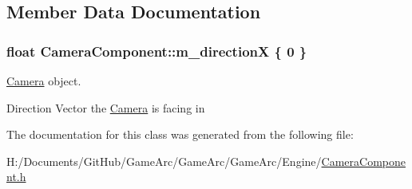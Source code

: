 \subsection{Member Data Documentation}
\hypertarget{class_camera_component_a7a95ace18cee6a6b88ac5873233e2cc3}{
\subsubsection[{m\+\_\+direction\+X}]{\setlength{\rightskip}{0pt plus 5cm}float Camera\+Component\+::m\+\_\+direction\+X \{ 0 \}}}\label{class_camera_component_a7a95ace18cee6a6b88ac5873233e2cc3}


\hyperlink{class_camera}{Camera} object. 

Direction Vector the \hyperlink{class_camera}{Camera} is facing in 

The documentation for this class was generated from the following file\+:\begin{DoxyCompactItemize}
\item 
H\+:/\+Documents/\+Git\+Hub/\+Game\+Arc/\+Game\+Arc/\+Game\+Arc/\+Engine/\hyperlink{_camera_component_8h}{Camera\+Component.\+h}\end{DoxyCompactItemize}
